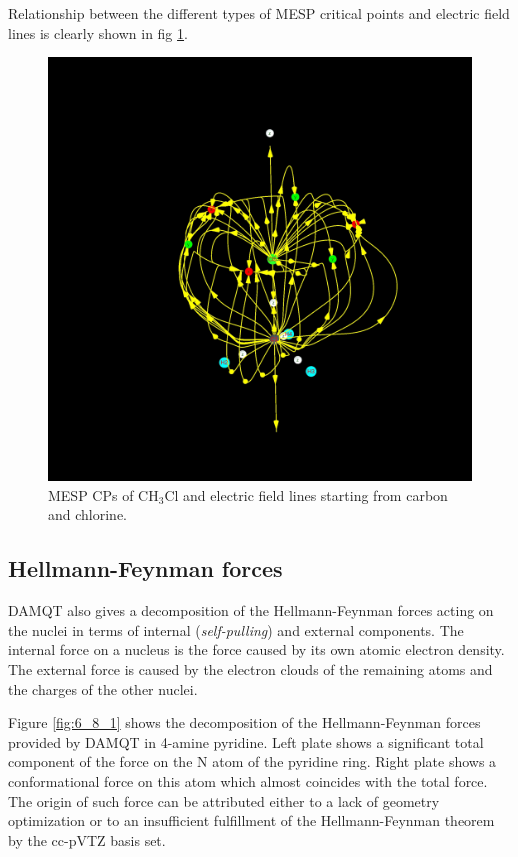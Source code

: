 \documentclass[10pt]{article}
\begin{document}
Relationship between the different types of MESP critical points and electric field lines is clearly shown in 
fig \ref{fig:6_7_2}.

\begin{figure}[H]
\begin{center}
\includegraphics[width=.30\linewidth]{CH3Cl-pVQZ_Cp_field.jpg}
\end{center}
\caption[MESP CPs and electric field of CH$_3$Cl]{ MESP CPs of CH$_3$Cl and electric field lines starting from carbon and chlorine.
\label{fig:6_7_2}}
\end{figure}

\subsection{Hellmann-Feynman forces \label{sec:6.8} }

DAMQT also gives a decomposition of the Hellmann-Feynman forces acting on the
nuclei in terms of internal 
({\it self-pulling}) and 
external
components. The internal force on a nucleus is the force caused by its own
atomic electron
density. The external force is caused by the electron clouds of
the remaining atoms and the charges of the other nuclei.

Figure \ref{fig:6_8_1} shows the decomposition of the Hellmann-Feynman forces
provided by DAMQT in 4-amine pyridine. Left plate shows a significant total
component of the force on the N atom of the pyridine ring. Right plate shows a
conformational force on this atom which almost coincides with the total force.
The origin of such force can be attributed either to a lack of geometry
optimization or to an insufficient fulfillment of the Hellmann-Feynman theorem
by the cc-pVTZ basis set.
\end{document}

